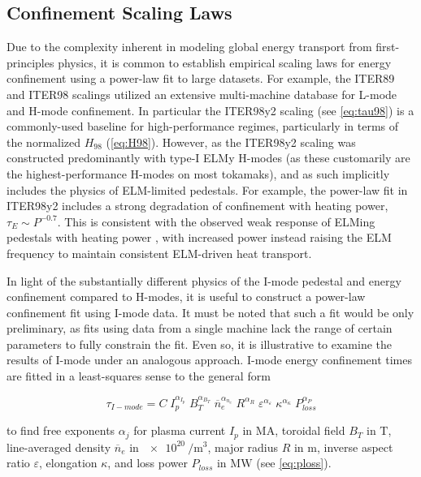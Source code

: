 \subsection{Confinement Scaling Laws}\label{subsec:imode_powerlaws}

Due to the complexity inherent in modeling global energy transport from first-principles physics, it is common to establish empirical scaling laws for energy confinement using a power-law fit to large datasets.  For example, the ITER89 \cite{Yushmanov1990} and ITER98 \cite{ITER1999} scalings utilized an extensive multi-machine database \cite{Christiansen1992} for L-mode and H-mode confinement.  In particular the ITER98y2 scaling (see \cref{eq:tau98}) is a commonly-used baseline for high-performance regimes, particularly in terms of the normalized $H_{98}$ (\cref{eq:H98}).  However, as the ITER98y2 scaling was constructed predominantly with type-I ELMy H-modes (as these customarily are the highest-performance H-modes on most tokamaks), and as such implicitly includes the physics of ELM-limited pedestals.  For example, the power-law fit in ITER98y2 includes a strong degradation of confinement with heating power, $\tau_E \sim P^{-0.7}$.  This is consistent with the observed weak response of ELMing pedestals with heating power \cite{Snyder2007}, with increased power instead raising the ELM frequency to maintain consistent ELM-driven heat transport.

In light of the substantially different physics of the I-mode pedestal and energy confinement compared to H-modes, it is useful to construct a power-law confinement fit using I-mode data.  It must be noted that such a fit would be only preliminary, as fits using data from a single machine lack the range of certain parameters to fully constrain the fit.  Even so, it is illustrative to examine the results of I-mode under an analogous approach.  I-mode energy confinement times are fitted in a least-squares sense to the general form

\begin{equation}\label{eq:taufit}
 \tau_{I-mode} = C \; I_p^{\alpha_{I_p}} \; B_T^{\alpha_{B_T}} \; \overline{n}_e^{\alpha_{n_e}} \; R^{\alpha_R} \; \varepsilon^{\alpha_\varepsilon} \; \kappa^{\alpha_\kappa} \; P_{loss}^{\alpha_P}
\end{equation}

\noindent to find free exponents $\alpha_j$ for plasma current $I_p$ in $\si{\mega\ampere}$, toroidal field $B_T$ in $\si{\tesla}$, line-averaged density $\overline{n}_e$ in $\SI{e20}{\per\meter\cubed}$, major radius $R$ in $\si{\meter}$, inverse aspect ratio $\varepsilon$, elongation $\kappa$, and loss power $P_{loss}$ in $\si{\mega\watt}$ (see \cref{eq:ploss}).

